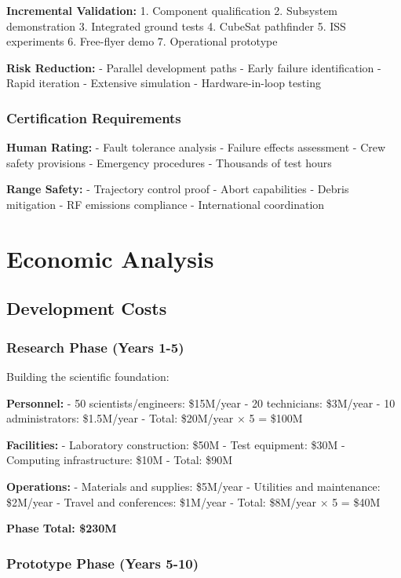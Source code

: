 \documentclass[12pt,letterpaper]{book}
\theoremstyle{definition}
\theoremstyle{plain}
\theoremstyle{remark}
\begin{document}
{{{{{\textbf{Incremental Validation:}
1. Component qualification
2. Subsystem demonstration
3. Integrated ground tests
4. CubeSat pathfinder
5. ISS experiments
6. Free-flyer demo
7. Operational prototype

\textbf{Risk Reduction:}
- Parallel development paths
- Early failure identification
- Rapid iteration
- Extensive simulation
- Hardware-in-loop testing

\subsection{Certification Requirements}

\textbf{Human Rating:}
- Fault tolerance analysis
- Failure effects assessment
- Crew safety provisions
- Emergency procedures
- Thousands of test hours

\textbf{Range Safety:}
- Trajectory control proof
- Abort capabilities
- Debris mitigation
- RF emissions compliance
- International coordination

\chapter{Economic Analysis}

\section{Development Costs}

\subsection{Research Phase (Years 1-5)}

Building the scientific foundation:

\textbf{Personnel:}
- 50 scientists/engineers: \$15M/year
- 20 technicians: \$3M/year
- 10 administrators: \$1.5M/year
- Total: \$20M/year × 5 = \$100M

\textbf{Facilities:}
- Laboratory construction: \$50M
- Test equipment: \$30M
- Computing infrastructure: \$10M
- Total: \$90M

\textbf{Operations:}
- Materials and supplies: \$5M/year
- Utilities and maintenance: \$2M/year
- Travel and conferences: \$1M/year
- Total: \$8M/year × 5 = \$40M

\textbf{Phase Total: \$230M}

\subsection{Prototype Phase (Years 5-10)}

}}}}}
\end{document}
